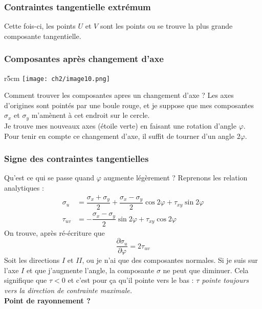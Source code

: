 \subsubsection{Contraintes tangentielle extrémum}
Cette fois-ci, les points $U$ et $V$ sont les points ou se trouve la plus grande composante tangentielle.
    
\subsubsection{Composantes après changement d'axe}
\begin{wrapfigure}[7]{r}{5cm}
	\texttt{[image: ch2/image10.png]}
\end{wrapfigure}
Comment trouver les composantes apres un changement d'axe ? Les axes d'origines sont pointés par une boule
rouge, et je suppose que mes composantes $\sigma_x$ et $\sigma_y$ m'amènent à cet endroit sur le cercle.\\
    
Je trouve mes nouveaux axes (étoile verte) en faisant une rotation d'angle $\varphi$. Pour tenir en compte
ce changement d'axe, il suffit de tourner d'un angle $2\varphi$.
    
\subsubsection{Signe des contraintes tangentielles}

Qu'est ce qui se passe quand $\varphi$ augmente légèrement ? Reprenons les relation analytiques :
\begin{equation}
	\begin{array}{ll}
		\sigma_u  & = \dfrac{\sigma_x+\sigma_y}{2} + \dfrac{\sigma_x-\sigma_y}{2}\cos 2\varphi + \tau_{xy}\sin 
		2\varphi\\
		\tau_{uv} & = -\dfrac{\sigma_x-\sigma_y}{2}\sin 2\varphi + \tau_{xy}\cos 2\varphi                      
	\end{array}
\end{equation}       
On trouve, après ré-écriture que 
\begin{equation}
	\frac{\partial \sigma_u}{\partial \varphi} = 2\tau_{uv}
\end{equation}
Soit les directions $I$ et $II$, ou je n'ai que des composantes normales. Si je suis sur l'axe $I$ et que
j'augmente l'angle, la composante $\sigma$ ne peut que diminuer. Cela signifique que $\tau < 0$ et c'est
pour ça qu'il pointe vers le bas : \textit{$\tau$ pointe toujours vers la direction de contrainte maximale.}
\\ \textbf{Point de rayonnement ?}
    
